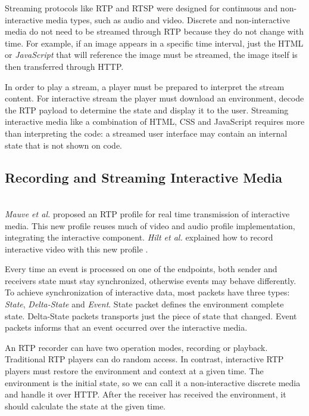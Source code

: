 	Streaming protocols like \ac {RTP} and \ac{RTSP} were designed for continuous and non-interactive media types, such as audio and video. Discrete and non-interactive media do not need to be streamed through \ac{RTP} because they do not change with time. For example, if an image appears in a specific time interval, just the \ac{HTML} or \emph{JavaScript} that will reference the image must be streamed, the image itself is then transferred through \ac{HTTP}.

	In order to play a stream, a player must be prepared to interpret the stream content. For interactive stream the player must download an environment, decode the \ac{RTP} payload to determine the state and display it to the user. Streaming interactive media like a combination of \ac{HTML}, \ac{CSS} and JavaScript requires more than interpreting the code: a streamed user interface may contain an internal state that is not shown on code.
        

 \subsection{Recording and Streaming Interactive Media}\label{intrecord}~\\
    \emph{Mauve et al.} proposed an \ac{RTP} profile for real time transmission of interactive media\cite{interactive_stream}. This new profile reuses much of video and audio profile implementation, integrating the interactive component. \emph{Hilt et al.} explained how to record interactive video with this new profile \cite{interactive_record}.

	Every time an event is processed on one of the endpoints, both sender and receivers state must stay synchronized, otherwise events may behave differently.
	To achieve synchronization of interactive data, most packets have three types: \emph{State}, \emph{Delta-State} and \emph{Event}. State packet defines the environment complete state. Delta-State packets transports just the piece of state that changed. Event packets informs that an event occurred over the interactive media. 

	An \ac{RTP} recorder can have two operation modes, recording or playback. Traditional \ac{RTP} players can do random access. In contrast, interactive \ac{RTP} players must restore the environment and context at a given time. The environment is the initial state, so we can call it a non-interactive discrete media and handle it over \ac{HTTP}. After the receiver has received the environment, it should calculate the state at the given time. 

